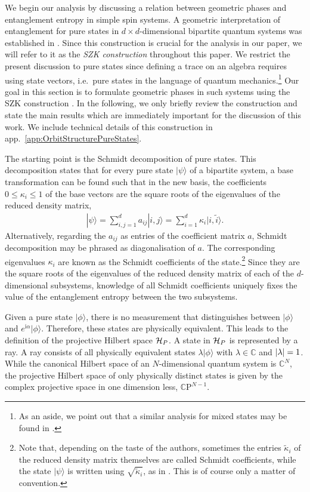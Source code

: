 \documentclass[a4paper,11pt]{article}
\newcommand{\CP}[1]{\mathds{C}\text{P}^{#1}}
\renewcommand{\i}{\text{i}}
\newcommand{\1}{\mathds{1}}
\begin{document}
We begin our analysis by discussing a relation between geometric phases and entanglement entropy in simple spin systems. A geometric interpretation of entanglement for pure states in $d\times d$-dimensional bipartite quantum systems was established in \cite{Sinolecka2002manifolds}. Since this construction is crucial for the analysis in our paper, we will refer to it as the \textit{SZK construction} throughout this paper. We restrict the present discussion to pure states since defining a trace on an algebra requires using state vectors, i.e.~pure states in the language of quantum mechanics.\footnote{As an aside, we point out that a similar analysis for mixed states may be found in \cite{zyczkowski2001monge}.} Our goal in this section is to formulate geometric phases in such systems using the SZK construction
\cite{Sinolecka2002manifolds}. In the following, we only briefly review the construction and state the main results which are immediately important for the discussion of this work.
We include technical details of this construction in app.~\ref{app:OrbitStructurePureStates}. 

The starting point is the Schmidt decomposition of pure states. This decomposition states that for every pure state $|\psi\rangle$ of a bipartite system, a base transformation can be found such that in the new basis, the coefficients $0\leq\kappa_i\leq1$ of the base vectors are the square roots of the eigenvalues of the reduced density matrix,
\begin{align}
    |\psi\rangle=\sum_{i,j=1}^da_{ij}|i,j\rangle=\sum_{i=1}^d\kappa_i|i,\tilde{i}\rangle.\label{eq:SchmidtDecompGeneral}
\end{align}
Alternatively, regarding the $a_{ij}$ as entries of the coefficient matrix $a$, Schmidt decomposition may be phrased as diagonalisation of $a$. The corresponding eigenvalues $\kappa_i$ are known as the Schmidt coefficients of the state.\footnote{Note that, depending on the taste of the authors, sometimes the entries $\tilde{\kappa}_i$ of the reduced density matrix themselves are called Schmidt coefficients, while the state $|\psi\rangle$ is written using $\sqrt{\tilde{\kappa}_i}$, as in \cite{Sinolecka2002manifolds}. This is of course only a matter of convention.} Since they are the square roots of the eigenvalues of the reduced density matrix of each of the $d$-dimensional subsystems, knowledge of all Schmidt coefficients uniquely fixes the value of the entanglement entropy between the two subsystems.

Given a pure state $|\phi\rangle$, there is no measurement that distinguishes between $|\phi\rangle$ and $e^{\i\alpha}|\phi\rangle$. Therefore, these states are physically equivalent. This leads to the definition of the projective Hilbert space ${\cal H}_P$. A state in ${\cal H}_P$ is represented by a ray. A ray consists of all physically equivalent states $\lambda|\phi\rangle$ with $\lambda\in\mathds{C}$ and $\abs{\lambda}=1$. While the canonical Hilbert space of an $N$-dimensional quantum system is $\mathds{C}^N$, the projective Hilbert space of only physically distinct states is given by the complex projective space in one dimension less, $\CP{N-1}$.
\end{document}
